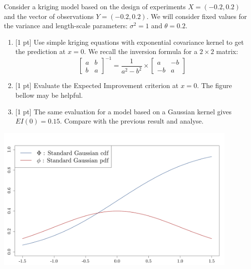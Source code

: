 \documentclass[a4paper,10pt]{article}
\begin{document}
Consider a kriging model based on the design of experiments $X=(-0.2,0.2)$ and the vector of observations $Y=(-0.2,0.2)$. We will consider fixed values for the variance and length-scale parameters: $\sigma^2=1$ and $\theta=0.2$.
\begin{enumerate}[label=Q\arabic*.]
\item {[1 pt]} Use simple kriging equations with exponential covariance kernel to get
  the prediction at \(x=0\). We recall the inversion formula for a $2 \times 2$ matrix:
  \begin{equation}
  \left[ \begin{array}{ccc}  a & b \\ b & a   \end{array} \right] ^{-1} = \frac{1}{a^2-b^2} \times \left[ \begin{array}{ccc}  a & -b \\ -b & a   \end{array} \right]
  \end{equation}
\item {[1 pt]} Evaluate the Expected Improvement criterion at \(x=0\). The figure bellow may be helpful.
\item {[1 pt]} The same evaluation for a model based on a Gaussian kernel gives $EI(0) = 0.15$. Compare with the previous result and analyse.
  \end{enumerate}

\begin{center}
  \includegraphics[width=12cm]{figures/exo_optim.pdf}
\end{center}
\end{document}
